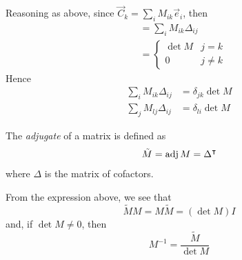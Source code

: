 \documentclass{../../template/note}
\begin{document}
    Reasoning as above, since \(\vec C_k = \sum_i M_{ik} \vec e_i\), then
    \begin{align*}
        [\vec C_1, \dots, \vec C_{j-1}, \vec C_k, \vec C_{j+1}, \dots, \vec C_n] &= \sum_i M_{ik} \Delta_{ij} \\
        &= \begin{cases}
            \det M & j = k \\
            0 & j \neq k
        \end{cases}
    \end{align*}
    Hence
    \begin{align*}
        \sum_i M_{ik} \Delta_{ij} &= \delta_{jk} \det M \\
        \sum_j M_{lj} \Delta_{ij} &= \delta_{li} \det M
    \end{align*}


    \begin{definition}
        The \emph{adjugate} of a matrix is defined as
        \[
            \tilde M = \operatorname{adj} M = \Delta^\intercal
        \]
        where \(\Delta\) is the matrix of cofactors.
    \end{definition}

    \begin{proposition}
        From the expression above, we see that
        \[
            \tilde MM = M\tilde M = (\det M) I
        \]
        and, if \(\det M \neq 0\), then
        \[
            M^{-1} = \frac{\tilde M}{\det M}
        \]
    \end{proposition}
    
\end{document}
